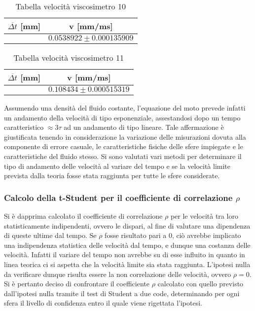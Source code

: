 \documentclass[a4paper,11pt,oneside]{article}
\begin{document}
\begin{table}[h!]
    \centering
    \begin{tabular}{|c|c|}
        \hline
        $\overline{\Delta t}$ [mm]& v [mm/ms]\\
        \hline
        \rowcolor[rgb]{0.85,0.85,0.85} & $0.0538922 \pm 0.000135909$\\
        \hline
    \end{tabular}
    \caption{Tabella velocità viscosimetro 10}
    \label{tab:vel10}
\end{table}

\begin{table}[h!]
    \centering
    \begin{tabular}{|c|c|}
        \hline
        $\overline{\Delta t}$ [mm] & v [mm/ms]\\
        \hline
        \rowcolor[rgb]{0.85,0.85,0.85} & $0.108434 \pm 0.000515319$\\
        \hline
    \end{tabular}
    \caption{Tabella velocità viscosimetro 11}
    \label{tab:vel11}
\end{table}


Assumendo una densità del fluido costante, l'equazione del moto prevede infatti un andamento della velocità di tipo esponenziale, assestandosi dopo un tempo caratteristico $\approx 3\tau$ ad un andamento di tipo lineare. Tale affermazione è giustificata tenendo in considerazione la variazione delle misurazioni dovuta alla componente di errore casuale, le caratteristiche fisiche delle sfere impiegate e le caratteristiche del fluido stesso.
Si sono valutati vari metodi per determinare il tipo di andamento delle velocità al variare del tempo e se la velocità limite prevista dalla teoria fosse stata raggiunta per tutte le sfere considerate.

\subsubsection*{Calcolo della t-Student per il coefficiente di correlazione $\rho$}
Si è dapprima calcolato il coefficiente di correlazione $\rho$ per le velocità tra loro statisticamente indipendenti, ovvero le dispari, al fine di valutare una dipendenza di queste ultime dal tempo.
Se $\rho$ fosse risultato pari a $0$, ciò avrebbe implicato una indipendenza statistica delle velocità dal tempo, e dunque una costanza delle velocità. Infatti il variare del tempo non avrebbe su di esse influito in quanto in linea teorica ci si aspetta che la velocità limite sia stata raggiunta. L'ipotesi nulla da verificare dunque risulta essere la non correlazione delle velocità, ovvero $\rho=0$.
Si è pertanto deciso di confrontare il coefficiente $\rho$ calcolato con quello previsto dall'ipotesi nulla tramite il test di Student a due code, determinando per ogni sfera il livello di confidenza entro il quale viene rigettata l'ipotesi.
\end{document}
